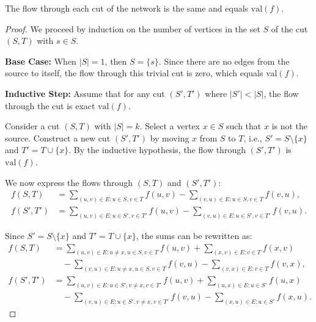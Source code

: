 \begin{lemma}
\label{lemma:second-cut}
    The flow through each cut of the network is the same and equals $\mathrm{val}(f)$.
\end{lemma}

\begin{proof}
    We proceed by induction on the number of vertices in the set \( S \) of the cut \( (S, T) \) with \(s \in S\). 

    \noindent \textbf{Base Case:} When \( |S| = 1 \), then \( S = \{s\}\). Since there are no edges from the source to itself, the flow through this trivial cut is zero, which equals $\mathrm{val}(f)$.

    \noindent \textbf{Inductive Step:} Assume that for any cut \( (S', T') \) where \( |S'| < |S| \), the flow through the cut is exact $\mathrm{val}(f)$. 

    Consider a cut \( (S, T) \) with \( |S| = k \). Select a vertex \( x \in S \) such that \( x \) is not the source. Construct a new cut \( (S', T') \) by moving \( x \) from \( S \) to \( T \), i.e., \( S' = S \setminus \{x\} \) and \( T' = T \cup \{x\} \). By the inductive hypothesis, the flow through \( (S', T') \) is $\mathrm{val}(f)$.

    We now express the flows through \( (S, T) \) and \( (S', T') \):
    \begin{align*}
        f(S, T) &= \sum_{(u, v) \in E: u \in S, v \in T} f(u, v) - \sum_{(v, u) \in E: u \in S, v \in T} f(v, u), \\
        f(S', T') &= \sum_{(u, v) \in E: u \in S', v \in T'} f(u, v) - \sum_{(v, u) \in E: u \in S', v \in T'} f(v, u).
    \end{align*}
    
    Since \( S' = S \setminus \{x\} \) and \( T' = T \cup \{x\} \), the sums can be rewritten as:
    \begin{align*}
        f(S, T) &= \sum_{(u, v) \in E: u \neq x, u \in S, v \in T} f(u, v) + \sum_{(x, v) \in E: v \in T} f(x, v) \\
        &\quad - \sum_{(v, u) \in E: u \neq x, u \in S, v \in T} f(v, u) - \sum_{(v, x) \in E: v \in T} f(v, x), \\
        f(S', T') &= \sum_{(u, v) \in E: u \in S', v \neq x, v \in T'} f(u, v) + \sum_{(u, x) \in E: u \in S'} f(u, x) \\
        &\quad - \sum_{(v, u) \in E: u \in S', v \neq x, v \in T'} f(v, u) - \sum_{(x, u) \in E: u \in S'} f(x, u).
    \end{align*}


\end{proof}
